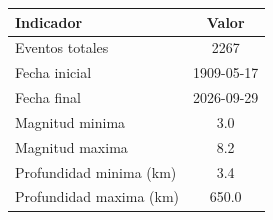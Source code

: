 \begin{tabular}{lc}
\toprule
Indicador & Valor \\
\midrule
Eventos totales & 2267 \\
Fecha inicial & 1909-05-17 \\
Fecha final & 2026-09-29 \\
Magnitud minima & 3.0 \\
Magnitud maxima & 8.2 \\
Profundidad minima (km) & 3.4 \\
Profundidad maxima (km) & 650.0 \\
\bottomrule
\end{tabular}